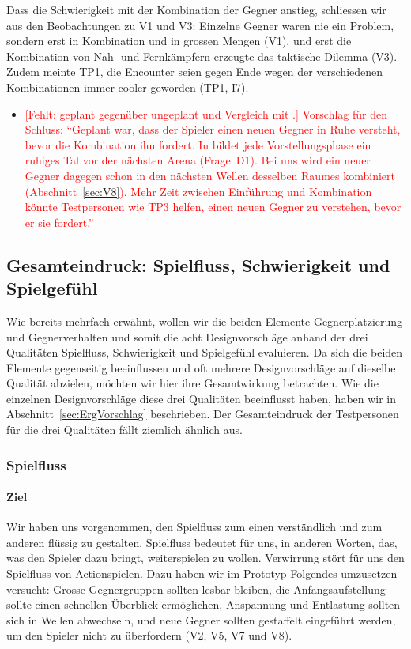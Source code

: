 \documentclass[../Main.tex]{subfiles}
\begin{document}
Dass die Schwierigkeit mit der Kombination der Gegner anstieg, schliessen wir aus den Beobachtungen zu V1 und V3: Einzelne Gegner waren nie ein Problem, sondern erst in Kombination und in grossen Mengen (V1), und erst die Kombination von Nah- und Fernkämpfern erzeugte das taktische Dilemma (V3). Zudem meinte TP1, die Encounter seien gegen Ende wegen der verschiedenen Kombinationen immer cooler geworden (TP1, I7).

\begin{itemize}[leftmargin=1.5cm]
    \item \textcolor{red}{[Fehlt: geplant gegenüber ungeplant und Vergleich mit .] Vorschlag für den Schluss: \enquote{Geplant war, dass der Spieler einen neuen Gegner in Ruhe versteht, bevor die Kombination ihn fordert. In  bildet jede Vorstellungsphase ein ruhiges Tal vor der nächsten Arena (Frage~D1). Bei uns wird ein neuer Gegner dagegen schon in den nächsten Wellen desselben Raumes kombiniert (Abschnitt~\ref{sec:V8}). Mehr Zeit zwischen Einführung und Kombination könnte Testpersonen wie TP3 helfen, einen neuen Gegner zu verstehen, bevor er sie fordert.}}
\end{itemize}

\subsection{Gesamteindruck: Spielfluss, Schwierigkeit und Spielgefühl} \label{sec:Gesamteindruck} \label{sec:ErgAllgemein}

Wie bereits mehrfach erwähnt, wollen wir die beiden Elemente Gegnerplatzierung und Gegnerverhalten und somit die acht Designvorschläge anhand der drei Qualitäten Spielfluss, Schwierigkeit und Spielgefühl evaluieren. Da sich die beiden Elemente gegenseitig beeinflussen und oft mehrere Designvorschläge auf dieselbe Qualität abzielen, möchten wir hier ihre Gesamtwirkung betrachten. Wie die einzelnen Designvorschläge diese drei Qualitäten beeinflusst haben, haben wir in Abschnitt~\ref{sec:ErgVorschlag} beschrieben. Der Gesamteindruck der Testpersonen für die drei Qualitäten fällt ziemlich ähnlich aus.

\subsubsection{Spielfluss}

\paragraph{Ziel}
Wir haben uns vorgenommen, den Spielfluss zum einen verständlich und zum anderen flüssig zu gestalten. Spielfluss bedeutet für uns, in anderen Worten, das, was den Spieler dazu bringt, weiterspielen zu wollen. Verwirrung stört für uns den Spielfluss von Actionspielen. Dazu haben wir im Prototyp Folgendes umzusetzen versucht: Grosse Gegnergruppen sollten lesbar bleiben, die Anfangsaufstellung sollte einen schnellen Überblick ermöglichen, Anspannung und Entlastung sollten sich in Wellen abwechseln, und neue Gegner sollten gestaffelt eingeführt werden, um den Spieler nicht zu überfordern (V2, V5, V7 und V8).
\end{document}
